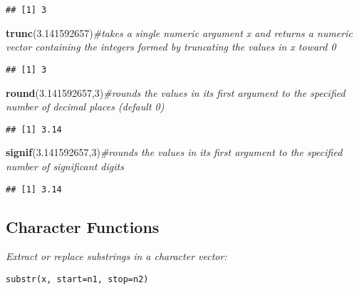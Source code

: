 \documentclass[]{book}
\newenvironment{Shaded}{\begin{snugshade}}{\end{snugshade}}
\newcommand{\KeywordTok}[1]{\textcolor[rgb]{0.13,0.29,0.53}{\textbf{#1}}}
\newcommand{\DecValTok}[1]{\textcolor[rgb]{0.00,0.00,0.81}{#1}}
\newcommand{\FloatTok}[1]{\textcolor[rgb]{0.00,0.00,0.81}{#1}}
\newcommand{\CommentTok}[1]{\textcolor[rgb]{0.56,0.35,0.01}{\textit{#1}}}
\newcommand{\NormalTok}[1]{#1}
\theoremstyle{definition}
\theoremstyle{definition}
\theoremstyle{definition}
\theoremstyle{remark}
\begin{document}
\begin{verbatim}
## [1] 3
\end{verbatim}

\begin{Shaded}
\begin{Highlighting}[]
\KeywordTok{trunc}\NormalTok{(}\FloatTok{3.141592657}\NormalTok{)}\CommentTok{#takes a single numeric argument x and returns a numeric vector containing the integers formed by truncating the values in x toward 0}
\end{Highlighting}
\end{Shaded}

\begin{verbatim}
## [1] 3
\end{verbatim}

\begin{Shaded}
\begin{Highlighting}[]
\KeywordTok{round}\NormalTok{(}\FloatTok{3.141592657}\NormalTok{,}\DecValTok{3}\NormalTok{)}\CommentTok{#rounds the values in its first argument to the specified number of decimal places (default 0)  }
\end{Highlighting}
\end{Shaded}

\begin{verbatim}
## [1] 3.14
\end{verbatim}

\begin{Shaded}
\begin{Highlighting}[]
\KeywordTok{signif}\NormalTok{(}\FloatTok{3.141592657}\NormalTok{,}\DecValTok{3}\NormalTok{)}\CommentTok{#rounds the values in its first argument to the specified number of significant digits}
\end{Highlighting}
\end{Shaded}

\begin{verbatim}
## [1] 3.14
\end{verbatim}

\subsection{Character Functions}\label{character-functions}

\emph{Extract or replace substrings in a character vector:}

\begin{verbatim}
substr(x, start=n1, stop=n2)    
\end{verbatim}
\end{document}
